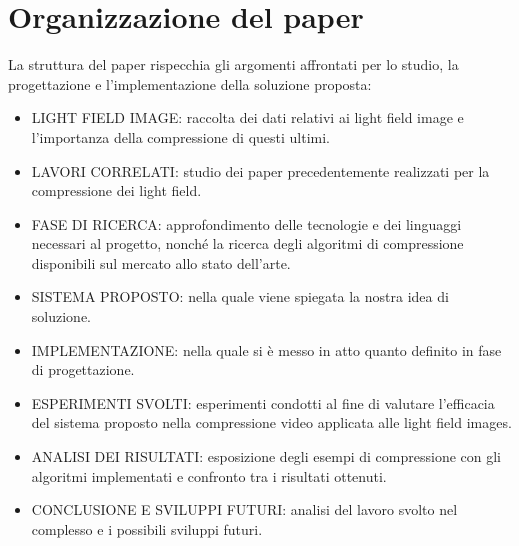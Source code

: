 \section{Organizzazione del paper}
La struttura del paper rispecchia gli argomenti affrontati per lo studio, la progettazione e l’implementazione della soluzione proposta:
\begin{itemize}
    \item LIGHT FIELD IMAGE: raccolta dei dati relativi ai light field image e l'importanza della compressione di questi ultimi.
    \item LAVORI CORRELATI: studio dei paper precedentemente realizzati per la compressione dei light field.
    \item FASE DI RICERCA: approfondimento delle tecnologie e dei linguaggi necessari al progetto, nonché la ricerca degli algoritmi di compressione disponibili sul mercato allo stato dell'arte.
    \item SISTEMA PROPOSTO: nella quale viene spiegata la nostra idea di soluzione.
    \item IMPLEMENTAZIONE: nella quale si è messo in atto quanto definito in fase di progettazione.
     \item ESPERIMENTI SVOLTI: esperimenti condotti al fine di valutare l'efficacia del sistema proposto nella compressione video applicata alle light field images.
    \item ANALISI DEI RISULTATI: esposizione degli esempi di compressione con gli algoritmi implementati e confronto tra i risultati ottenuti.
    \item CONCLUSIONE E SVILUPPI FUTURI: analisi del lavoro svolto nel complesso e i possibili sviluppi futuri.
\end{itemize}
